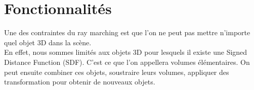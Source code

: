 \section{Fonctionnalités}
Une des contraintes du ray marching est que l'on ne peut pas mettre n'importe quel objet 3D dans la scène.\\
En effet, nous sommes limités aux objets 3D pour lesquels il existe une Signed Distance Function (SDF). C'est ce que l'on appellera volumes élémentaires. On peut ensuite combiner ces objets, soustraire leurs volumes, appliquer des transformation pour obtenir de nouveaux objets.



